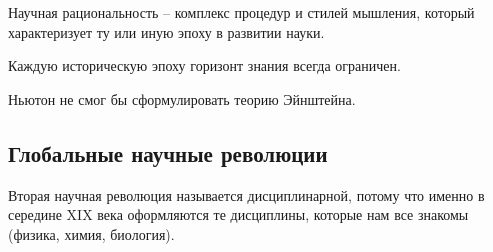 \documentclass[main.tex]{subfiles}
\begin{document}

Научная рациональность -- комплекс процедур и стилей мышления, который характеризует ту или иную эпоху в развитии науки.

Каждую историческую эпоху горизонт знания всегда ограничен.

Ньютон не смог бы сформулировать теорию Эйнштейна.


\subsection{Глобальные научные революции}



Вторая научная революция называется дисциплинарной, потому что именно в середине XIX века оформляются те дисциплины, которые нам все знакомы (физика, химия, биология).

\end{document}
